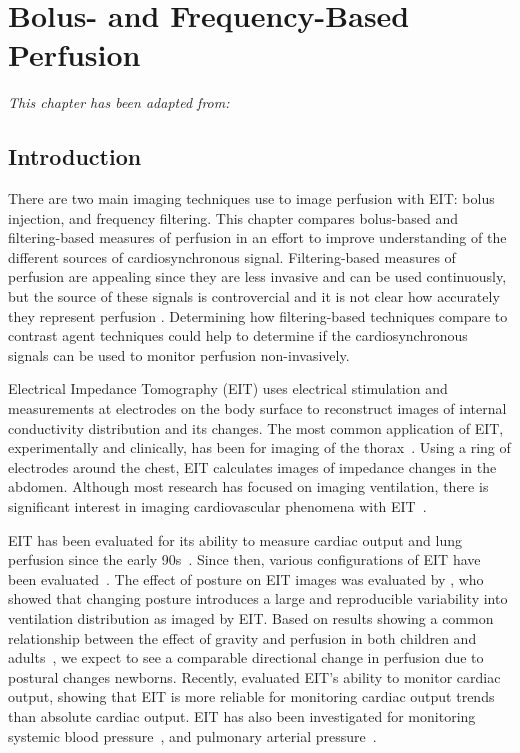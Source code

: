 \chapter{Bolus- and Frequency-Based Perfusion}
\label{chap:chapter-3}

\emph{This chapter has been adapted from: \\ 
}

\section{Introduction}

There are two main imaging techniques use to image perfusion with EIT: bolus injection, and frequency
filtering. This chapter compares bolus-based and filtering-based measures of perfusion 
in an effort to improve understanding of the different sources of cardiosynchronous signal. 
Filtering-based measures of perfusion are appealing 
since they are less invasive and can be used continuously, but the source of these signals 
is controvercial and it is not clear how accurately they represent perfusion
\parencite{adler_origins_2017}. Determining how filtering-based techniques compare to contrast 
agent techniques could help to determine if the cardiosynchronous signals can be used 
to monitor perfusion non-invasively. 

Electrical Impedance Tomography (EIT) uses 
electrical stimulation and measurements at electrodes on the
body surface to reconstruct images of internal conductivity
distribution and its changes.
The most common application of EIT, experimentally and clinically,
has been for imaging of the thorax~\parencite{frerichs_chest_2017}.
Using a ring of electrodes around the chest, EIT calculates
images of impedance changes in the abdomen.
Although most research has focused on
imaging ventilation, there is significant interest in imaging
cardiovascular phenomena with EIT~\parencite{adler_whither_2012,leonhardt_electrical_2012}. 

EIT has been evaluated for its ability to measure cardiac output and
lung perfusion since the early 90s~\parencite{eyuboglu_vivo_1989,zadehkoochak_pulmonary_1992,frerichs_regional_2002}.
Since then, various configurations of EIT have been evaluated~\parencite{borges_regional_2012,nguyen_perfusion_2015}.
The effect of posture on EIT images
was evaluated by , 
who showed that changing posture
introduces a large and reproducible variability into ventilation 
distribution as imaged by EIT.
Based on results showing a common relationship between the 
effect of gravity and perfusion in both children and
adults~\parencite{bhuyan_effects_1989},
we expect to see a comparable directional change in perfusion due to postural changes
newborns.
Recently,  evaluated EIT's ability to monitor
cardiac output, showing that EIT is more reliable for monitoring
cardiac output trends than absolute cardiac output.
EIT has also been investigated for
monitoring systemic blood pressure~\parencite{sola_non-invasive_2011}, and 
pulmonary arterial pressure~\parencite{proenca_noninvasive_2017}.

